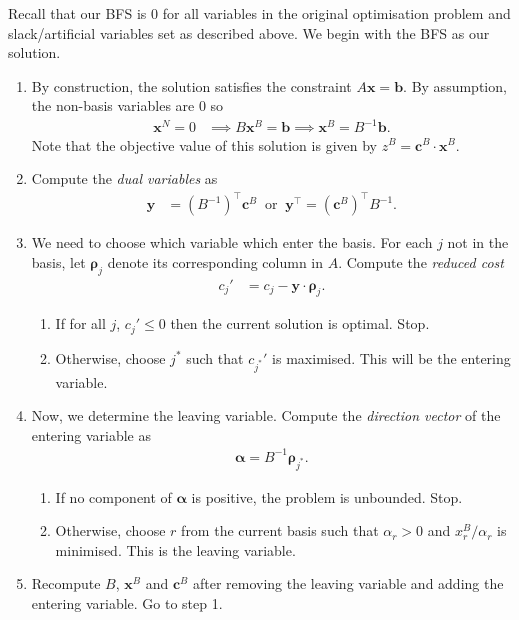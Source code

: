 \documentclass[12pt,a4paper]{article} %
\begin{document}
Recall that our BFS is $0$ for all variables in the 
original optimisation problem and slack/artificial variables set as described above.
We begin with the BFS as our solution. 
\begin{enumerate}
    \item By construction, the solution satisfies 
    the constraint $A\bm x = \bm b$. By assumption, 
    the non-basis variables are $0$ so 
    \begin{align*}
        \bm x^N = 0 &\implies B\bm x^B = \bm b \implies \bm x^B = B^{-1} \bm b.
    \end{align*} 
    Note that the objective value of this solution is given by $z^B = \bm c^B \cdot \bm x^B$.
    \item Compute the \textit{dual variables} as 
    \begin{align*}
        \bm y &= (B^{-1})^\top \bm c^B ~\text{ or }~ \bm y^\top = (\bm c^B)^\top B^{-1}.
    \end{align*}
    \item We need to choose which variable which enter the basis. 
    For each $j$ not in the basis, let $\bm\rho_j$ denote its corresponding 
    column in $A$. Compute the \textit{reduced cost}
    \begin{align*}
        c_j' &= c_j - \bm y \cdot \bm\rho_j.
    \end{align*}
    \begin{enumerate}
        \item If for all $j$, $c_j' \le 0$ then the current solution is optimal. Stop.
        \item Otherwise, choose $j^*$ such that $c_{j^*}'$ is maximised. 
        This will be the entering variable.
    \end{enumerate}
    \item Now, we determine the leaving variable. Compute the \textit{direction vector}
    of the entering variable as 
    \begin{align*}
        \bm \alpha = B^{-1} \bm \rho_{j^*}.
    \end{align*}
    \begin{enumerate}
        \item If no component of $\bm \alpha$ is positive, the problem is unbounded. Stop.
        \item Otherwise, choose $r$ from the current basis such that $\alpha_r > 0$ 
        and $x^B_r / \alpha_r$ is minimised. This is the leaving variable.
    \end{enumerate}
    \item Recompute $B$, $\bm x^B$ and $\bm c^B$ after removing the leaving variable 
    and adding the entering variable. Go to step 1.

\end{enumerate}
\end{document}
